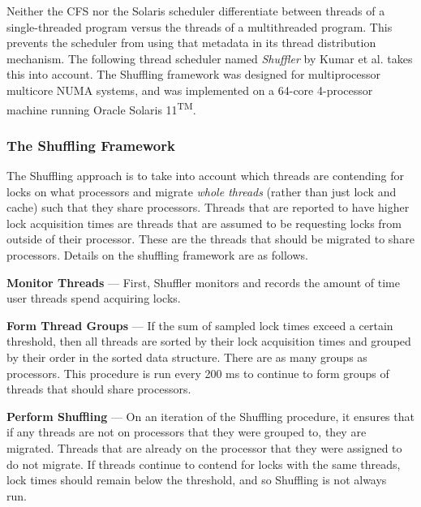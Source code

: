 \documentclass{sig-alternate}
\begin{document}
Neither the CFS nor the Solaris scheduler differentiate between threads of a single-threaded program versus the threads of a multithreaded program. This prevents the scheduler from using that metadata in its thread distribution mechanism. The following thread scheduler named \emph{Shuffler} by Kumar et al. takes this into account. The Shuffling framework was designed for multiprocessor multicore NUMA systems, and was implemented on a 64-core 4-processor machine running Oracle Solaris 11\textsuperscript{TM}.~\cite{Kumar:2014}

\subsubsection{The Shuffling Framework}

The Shuffling approach is to take into account which threads are contending for locks on what processors and migrate \textit{whole threads} (rather than just lock and cache) such that they share processors. Threads that are reported to have higher lock acquisition times are threads that are assumed to be requesting locks from outside of their processor. These are the threads that should be migrated to share processors. Details on the shuffling framework are as follows.

\vspace{2 mm}

\textbf{Monitor Threads} --- First, Shuffler monitors and records the amount of time user threads spend acquiring locks.

\vspace{2 mm}

\textbf{Form Thread Groups} --- If the sum of sampled lock times exceed a certain threshold, then all threads are sorted by their lock acquisition times and grouped by their order in the sorted data structure. There are as many groups as processors. This procedure is run every 200 ms to continue to form groups of threads that should share processors.

\vspace{2 mm}

\textbf{Perform Shuffling} --- On an iteration of the Shuffling procedure, it ensures that if any threads are not on processors that they were grouped to, they are migrated. Threads that are already on the processor that they were assigned to do not migrate. If threads continue to contend for locks with the same threads, lock times should remain below the threshold, and so Shuffling is not always run.~\cite{Kumar:2014}
\end{document}
